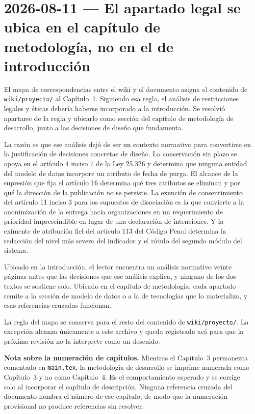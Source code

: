 \section{2026-08-11 — El apartado legal se ubica en el capítulo de metodología, no en el de introducción}

El mapa de correspondencias entre el wiki y el documento asigna el contenido de \texttt{wiki/proyecto/} al Capítulo~1. Siguiendo esa regla, el análisis de restricciones legales y éticas debería haberse incorporado a la introducción. Se resolvió apartarse de la regla y ubicarlo como sección del capítulo de metodología de desarrollo, junto a las decisiones de diseño que fundamenta.

La razón es que ese análisis dejó de ser un contexto normativo para convertirse en la justificación de decisiones concretas de diseño. La conservación sin plazo se apoya en el artículo 4 inciso 7 de la Ley 25.326 y determina que ninguna entidad del modelo de datos incorpore un atributo de fecha de purga. El alcance de la supresión que fija el artículo 16 determina qué tres atributos se eliminan y por qué la dirección de la publicación no se persiste. La exención de consentimiento del artículo 11 inciso 3 para los supuestos de disociación es la que convierte a la anonimización de la entrega hacia organizaciones en un requerimiento de prioridad imprescindible en lugar de una declaración de intenciones. Y la eximente de atribución fiel del artículo 113 del Código Penal determina la redacción del nivel más severo del indicador y el rótulo del segundo módulo del sistema.

Ubicado en la introducción, el lector encuentra un análisis normativo veinte páginas antes que las decisiones que ese análisis explica, y ninguno de los dos textos se sostiene solo. Ubicado en el capítulo de metodología, cada apartado remite a la sección de modelo de datos o a la de tecnologías que lo materializa, y esas referencias cruzadas funcionan.

La regla del mapa se conserva para el resto del contenido de \texttt{wiki/proyecto/}. La excepción alcanza únicamente a este archivo y queda registrada acá para que la próxima revisión no la interprete como un descuido.

\bigskip

\noindent\textbf{Nota sobre la numeración de capítulos.} Mientras el Capítulo~3 permanezca comentado en \texttt{main.tex}, la metodología de desarrollo se imprime numerada como Capítulo~3 y no como Capítulo~4. Es el comportamiento esperado y se corrige solo al incorporar el capítulo de descripción. Ninguna referencia cruzada del documento nombra el número de ese capítulo, de modo que la numeración provisional no produce referencias sin resolver.
